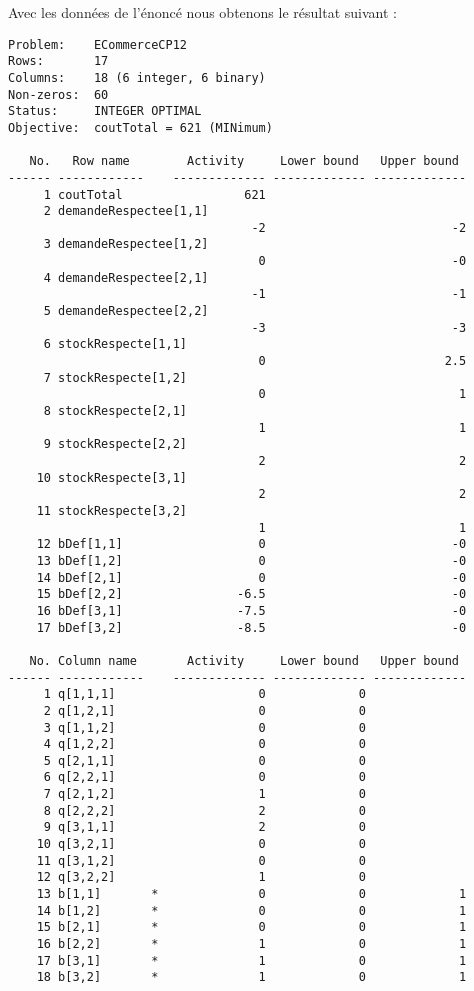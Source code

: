 Avec les données de l'énoncé nous obtenons le résultat suivant :
\begin{lstlisting}
Problem:    ECommerceCP12
Rows:       17
Columns:    18 (6 integer, 6 binary)
Non-zeros:  60
Status:     INTEGER OPTIMAL
Objective:  coutTotal = 621 (MINimum)

   No.   Row name        Activity     Lower bound   Upper bound
------ ------------    ------------- ------------- -------------
     1 coutTotal                 621
     2 demandeRespectee[1,1]
                                  -2                          -2
     3 demandeRespectee[1,2]
                                   0                          -0
     4 demandeRespectee[2,1]
                                  -1                          -1
     5 demandeRespectee[2,2]
                                  -3                          -3
     6 stockRespecte[1,1]
                                   0                         2.5
     7 stockRespecte[1,2]
                                   0                           1
     8 stockRespecte[2,1]
                                   1                           1
     9 stockRespecte[2,2]
                                   2                           2
    10 stockRespecte[3,1]
                                   2                           2
    11 stockRespecte[3,2]
                                   1                           1
    12 bDef[1,1]                   0                          -0
    13 bDef[1,2]                   0                          -0
    14 bDef[2,1]                   0                          -0
    15 bDef[2,2]                -6.5                          -0
    16 bDef[3,1]                -7.5                          -0
    17 bDef[3,2]                -8.5                          -0

   No. Column name       Activity     Lower bound   Upper bound
------ ------------    ------------- ------------- -------------
     1 q[1,1,1]                    0             0
     2 q[1,2,1]                    0             0
     3 q[1,1,2]                    0             0
     4 q[1,2,2]                    0             0
     5 q[2,1,1]                    0             0
     6 q[2,2,1]                    0             0
     7 q[2,1,2]                    1             0
     8 q[2,2,2]                    2             0
     9 q[3,1,1]                    2             0
    10 q[3,2,1]                    0             0
    11 q[3,1,2]                    0             0
    12 q[3,2,2]                    1             0
    13 b[1,1]       *              0             0             1
    14 b[1,2]       *              0             0             1
    15 b[2,1]       *              0             0             1
    16 b[2,2]       *              1             0             1
    17 b[3,1]       *              1             0             1
    18 b[3,2]       *              1             0             1


\end{lstlisting}
